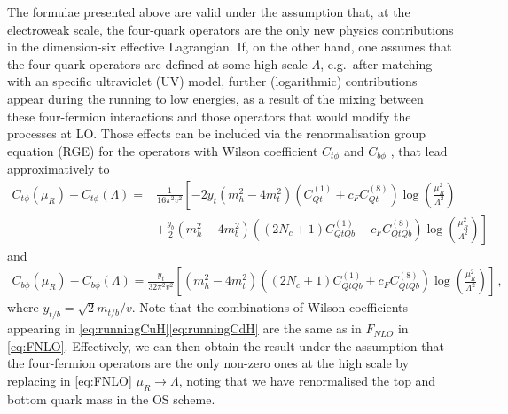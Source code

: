 The formulae presented above are valid under the assumption that, at the electroweak scale, the four-quark operators are the only new physics contributions in the dimension-six effective Lagrangian. If, on the other hand, one assumes that the four-quark operators are defined at some high scale $\Lambda$, e.g.~after matching with an specific ultraviolet (UV) model, further (logarithmic) contributions appear during the running to low energies, as a result of the mixing between these four-fermion interactions and those operators that would modify the processes at LO. 
Those effects can be included via the renormalisation group equation (RGE) for the operators with Wilson coefficient $C_{t\phi}$  and $C_{b\phi}$  \cite{Jenkins:2013zja, Jenkins:2013wua}, that lead approximatively to 
\begin{equation}
	\begin{split}
		C_{t\phi}(\mu_R)-C_{t\phi}(\Lambda)= &\frac{1}{16 \pi^2 v^2} \left[-2  y_t (m_h^2  -4 m_t^2) (C_{Qt}^{(1)}+c_F C_{Qt}^{(8)} )\log\left( \frac{\mu_R^2}{\Lambda^2}\right) \right.\\
		& \left.+ \frac{y_b}{2} (m_h^2-4 m_b^2)\left(  (2N_c+1)  C_{QtQb}^{(1)}+   c_F C_{QtQb}^{(8)}\right)\log\left( \frac{\mu_R^2}{\Lambda^2}\right)\right] \label{eq:runningCuH}
	\end{split}
\end{equation}
and
\begin{equation}
	\begin{split}
		C_{b\phi}(\mu_R)-C_{b\phi}(\Lambda)= \frac{y_t}{32 \pi^2 v^2} \left[  (m_h^2-4 m_t^2)\left(  (2N_c+1)  C_{QtQb}^{(1)}+   c_F C_{QtQb}^{(8)}\right)\log\left( \frac{\mu_R^2}{\Lambda^2}\right)\right]\,, \label{eq:runningCdH}
	\end{split}
\end{equation}
where $y_{t/b}=\sqrt{2} m_{t/b}/v$.
Note that the combinations of Wilson coefficients  appearing in \eqref{eq:runningCuH}\eqref{eq:runningCdH} are the same as in $F_{NLO}$ in \eqref{eq:FNLO}.
Effectively, we can then obtain the result under the assumption that the four-fermion operators are the only non-zero ones at the high scale by replacing in \eqref{eq:FNLO} $\mu_R \to \Lambda$, noting that we have renormalised the top and bottom quark mass in the OS scheme.

